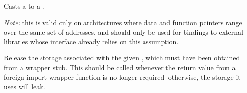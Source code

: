 \begin{haddockdesc}
\item[\begin{tabular}{@{}l}
castPtrToFunPtr :: Ptr a -> FunPtr b
\end{tabular}]
{\haddockbegindoc
Casts a  to a .\par
\emph{Note:} this is valid only on architectures where data and function
 pointers range over the same set of addresses, and should only be used
 for bindings to external libraries whose interface already relies on
 this assumption.\par}
\end{haddockdesc}
\begin{haddockdesc}
\item[\begin{tabular}{@{}l}
freeHaskellFunPtr :: FunPtr a -> IO ()
\end{tabular}]
{\haddockbegindoc
Release the storage associated with the given , which
 must have been obtained from a wrapper stub.  This should be called
 whenever the return value from a foreign import wrapper function is
 no longer required; otherwise, the storage it uses will leak.\par}
\end{haddockdesc}
